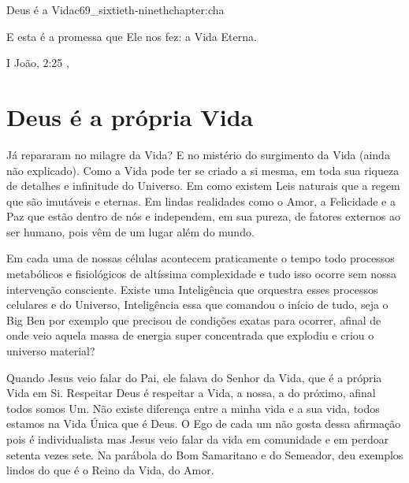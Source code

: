 \begin{chapterpage}{Deus é a Vida}{c69_sixtieth-ninethchapter:cha}
 
\begin{myquotation}E esta é a promessa que Ele nos fez: a Vida Eterna.
\par\vspace*{15mm}
\mbox{}\hfill \emdash{}I João, 2:25
, %
\par\end{myquotation}

\end{chapterpage}



\section{Deus é a própria Vida}\label{c1_basicformatting:sec}

\emdash{}Já repararam no milagre da Vida? E no mistério do surgimento da Vida (ainda não explicado). Como a Vida pode ter se criado a si mesma, em toda sua riqueza de detalhes e infinitude do Universo. Em como existem Leis naturais que a regem que são imutáveis e eternas. Em lindas realidades como o Amor, a Felicidade e a Paz que estão dentro de nós e independem, em sua pureza, de fatores externos ao ser humano, pois vêm de um lugar além do mundo.

\emdash{}Em cada uma de nossas células acontecem praticamente o tempo todo processos metabólicos e fisiológicos de altíssima complexidade e tudo isso ocorre sem nossa intervenção consciente. Existe uma Inteligência que orquestra esses processos celulares e do Universo, Inteligência essa que comandou o início de tudo, seja o Big Ben por exemplo que precisou de condições exatas para ocorrer, afinal de onde veio aquela massa de energia super concentrada que explodiu e criou o universo material?

\emdash{}Quando Jesus veio falar do Pai, ele falava do Senhor da Vida, que é a própria Vida em Si. Respeitar Deus é respeitar a Vida, a nossa, a do próximo, afinal todos somos Um. Não existe diferença entre a minha vida e a sua vida, todos estamos na Vida Única que é Deus. O Ego de cada um não gosta dessa afirmação pois é individualista mas Jesus veio falar da vida em comunidade e em perdoar setenta vezes sete. Na parábola do Bom Samaritano e do Semeador, deu exemplos lindos do que é o Reino da Vida, do Amor. 

